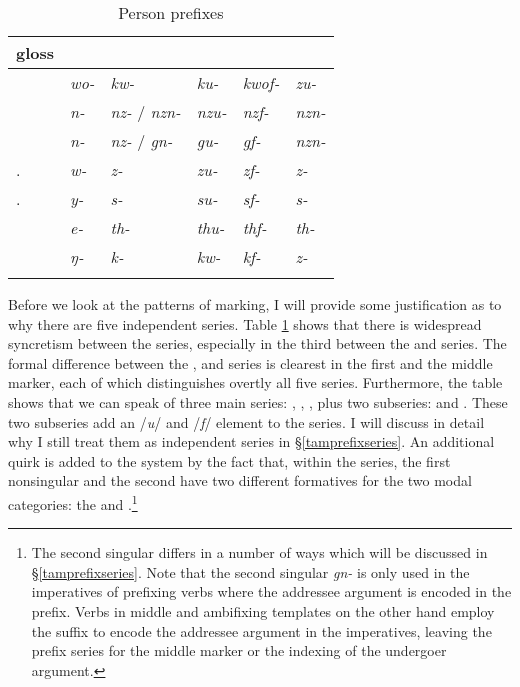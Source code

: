 \begin{table}
\caption{Person prefixes}
\label{perspref}
	\begin{tabular}{llllll}
		\lsptoprule
		{gloss} &\Alph &\Bet &\Betaone &\Betatwo &\Gam\\\midrule
		\Fsg &\emph{wo-} &\emph{kw-} &\emph{ku-} &\emph{kwof-} &\emph{zu-}\\
		\Fnsg &\emph{n-} &\emph{nz-} / \emph{nzn-} &\emph{nzu-} &\emph{nzf-} &\emph{nzn-}\\
		\Ssg &\emph{n-}	&\emph{nz-} / \emph{gn-} &\emph{gu-} &\emph{gf-} &\emph{nzn-}\\
		\Tsg.\F &\emph{w-} &\emph{z-} &\emph{zu-} &\emph{zf-} &\emph{z-}\\
		\Tsg.\Masc &\emph{y-} &\emph{s-} &\emph{su-} &\emph{sf-} &\emph{s-}\\
		\Stnsg &\emph{e-} &\emph{th-} &\emph{thu-} &\emph{thf-} &\emph{th-}\\
		\M &\emph{ŋ-} &\emph{k-} &\emph{kw-} &\emph{kf-} &\emph{z-}\\
		\lspbottomrule
	\end{tabular}
\end{table}%

Before we look at the patterns of  marking, I will provide some justification as to why there are five independent series. Table \ref{perspref} shows that there is widespread syncretism between the series, especially in the third  between the \Bet{} and \Gam{} series. The formal difference between the \Alph, \Bet{} and \Gam{} series is clearest in the first   and the middle marker, each of which distinguishes overtly all five series. Furthermore, the table shows that we can speak of three main series: \Alph, \Bet, \Gam{}, plus two subseries: \Betaone{} and \Betatwo. These two subseries add an /\emph{u}/ and /\emph{f}/ element to the \Bet{} series. I will discuss in detail why I still treat them as independent series in \S{}\ref{tamprefixseries}. An additional quirk is added to the system by the fact that, within the \Bet{} series, the first nonsingular and the second  have two different formatives for the two modal categories: the  and .\footnote{The second singular differs in a number of ways which will be discussed in \S{}\ref{tamprefixseries}. Note that the second singular \emph{gn-} is only used in the imperatives of prefixing verbs where the addressee argument is encoded in the prefix. Verbs in middle and ambifixing templates on the other hand employ the suffix to encode the addressee argument in the imperatives, leaving the prefix \Bet{} series for the middle marker or the indexing of the undergoer argument.}%

